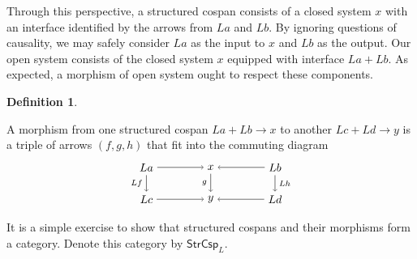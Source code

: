 \documentclass{amsart}
\newcommand{\StrCsp}{\cat{StrCsp}}
\newcommand{\cat}[1]{\mathsf{#1}}
\newcommand{\csp}[3]{#1 + #3 \to #2}
\theoremstyle{remark}
\theoremstyle{definition}
\newtheorem{definition}[theorem]{Definition}
\begin{document}
Through this perspective, a structured cospan consists of a closed
system $ x $ with an interface identified by the arrows from $ La $
and $ Lb $. By ignoring questions of causality, we may safely consider
$ La $ as the input to $ x $ and $ Lb $ as the output. Our open system
consists of the closed system $ x $ equipped with interface
$ La + Lb $. As expected, a morphism of open system
ought to respect these components.

\begin{definition} \label{df:morph-of-strcsp}

  A morphism from one structured cospan
  \(
    \csp{La}{x}{Lb}
  \)
  to another
  \(
    \csp{Lc}{y}{Ld}
  \)
  is a triple of arrows $ ( f,g,h ) $ that fit into the commuting
  diagram
  \[
    \begin{tikzpicture}
      \node (1) at (-2,1) {\( La \)};
      \node (2) at (0,1) {\( x \)};
      \node (3) at (2,1) {\( Lb \)};
      \node (4) at (-2,0) {\( Lc \)};
      \node (5) at (0,0) {\( y \)};
      \node (6) at (2,0) {\( Ld \)};
      \draw [->] (1) to node [above] {\scriptsize{\(  \)}} (2);
      \draw [->] (3) to node [above] {\scriptsize{\(  \)}} (2);
      \draw [->] (4) to node [below] {\scriptsize{\(  \)}} (5);
      \draw [->] (6) to node [below] {\scriptsize{\(  \)}} (5);
      \draw [->] (1) to node [left] {\scriptsize{\( Lf \)}} (4);
      \draw [->] (2) to node [left] {\scriptsize{\( g \)}} (5);
      \draw [->] (3) to node [right] {\scriptsize{\( Lh \)}} (6);
    \end{tikzpicture}
  \]
\end{definition}

It is a simple exercise to show that structured cospans and their
morphisms form a category.  Denote this category by $ \StrCsp_L
$. 
\end{document}
